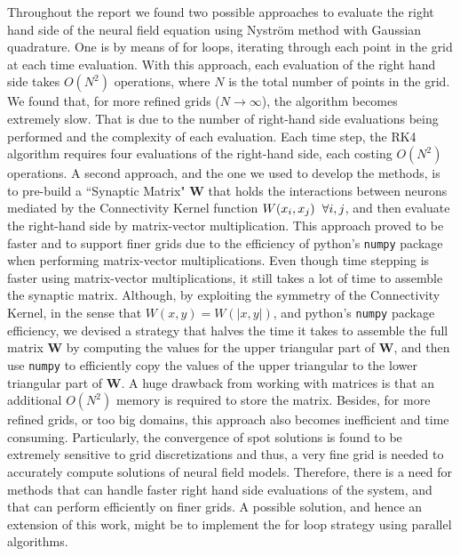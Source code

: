 \documentclass{uonmathreport}
\begin{document}
Throughout the report we found two possible approaches to evaluate the right hand side of the neural field equation using Nystr\"om method with Gaussian quadrature. One is by means of for loops, iterating through each point in the grid at each time evaluation. With this approach, each evaluation of the right hand side takes $O(N^2)$ operations, where $N$ is the total number of points in the grid. We found that, for more refined grids ($N\rightarrow \infty$), the algorithm becomes extremely slow. That is due to the number of right-hand side evaluations being performed and the complexity of each evaluation. Each time step, the RK4 algorithm requires four evaluations of the right-hand side, each costing $O(N^2)$ operations. A second approach, and the one we used to develop the methods, is to pre-build a ``Synaptic Matrix" $\textbf{W}$ that holds the interactions between neurons mediated by the Connectivity Kernel function $W(x_i,x_j) \hspace{2mm} \forall i,j$, and then evaluate the right-hand side by matrix-vector multiplication. This approach proved to be faster and to support finer grids due to the efficiency of python's \texttt{numpy} package when performing matrix-vector multiplications. Even though time stepping is faster using matrix-vector multiplications, it still takes a lot of time to assemble the synaptic matrix. Although, by exploiting the symmetry of the Connectivity Kernel, in the sense that $W(x,y) = W(|x,y|)$, and python's \texttt{numpy} package efficiency, we devised a strategy that halves the time it takes to assemble the full matrix $\textbf{W}$ by computing the values for the upper triangular part of $\textbf{W}$, and then use \texttt{numpy} to efficiently copy the values of the upper triangular to the lower triangular part of $\textbf{W}$. A huge drawback from working with matrices is that an additional $O(N^2)$ memory is required to store the matrix. Besides, for more refined grids, or too big domains, this approach also becomes inefficient and time consuming. Particularly, the convergence of spot solutions is found to be extremely sensitive to grid discretizations and thus, a very fine grid is needed to accurately compute solutions of neural field models. Therefore, there is a need for methods that can handle faster right hand side evaluations of the system, and that can perform efficiently on finer grids. A possible solution, and hence an extension of this work, might be to implement the for loop strategy using parallel algorithms.

\newpage
\end{document}
